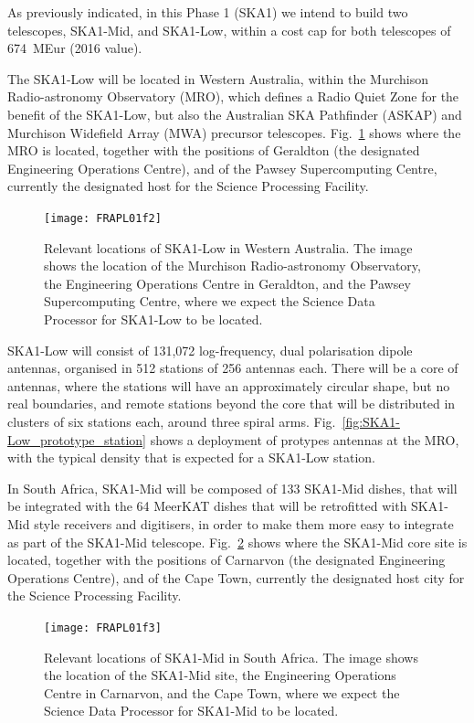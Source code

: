 \documentclass[a4paper,
               biblatex,       %
               keeplastbox,    %
               ]{jacow-2_1}    %
\begin{document}
As previously indicated, in this Phase 1 (SKA1) we intend to build two telescopes, SKA1-Mid, and SKA1-Low, within a cost cap for both telescopes of 674~MEur (2016 value).

The SKA1-Low will be located in Western Australia, within the Murchison Radio-astronomy Observatory (MRO), which defines a Radio Quiet Zone for the benefit of the SKA1-Low, but also the Australian SKA Pathfinder (ASKAP) and Murchison Widefield Array (MWA) precursor telescopes. Fig.~\ref{fig:SKA1-Low_locations} shows where the MRO is located, together with the positions of Geraldton (the designated Engineering Operations Centre), and of the Pawsey Supercomputing Centre, currently the designated host for the Science Processing Facility.

\begin{figure}[!tb]
  \centering
    \texttt{[image: FRAPL01f2]}
  \caption{Relevant locations of SKA1-Low in Western Australia. The image shows the location of the Murchison Radio-astronomy Observatory,  the Engineering Operations Centre in Geraldton, and the Pawsey Supercomputing Centre, where we expect the Science Data Processor for SKA1-Low to be located.}
  \label{fig:SKA1-Low_locations}
\end{figure}

SKA1-Low will consist of 131,072 log-frequency, dual polarisation dipole antennas, organised in 512 stations of 256 antennas each. There will be a core of antennas, where the stations will have an approximately circular shape, but no real boundaries, and remote stations beyond the core that will be distributed in clusters of six  stations each, around three spiral arms. Fig.~\ref{fig:SKA1-Low_prototype_station} shows a deployment of protypes antennas at the MRO, with the typical density that is expected for a SKA1-Low station.

In South Africa, SKA1-Mid will be composed of 133 SKA1-Mid dishes, that will be integrated with the 64 MeerKAT dishes that will be retrofitted with SKA1-Mid style receivers and digitisers, in order to make them more easy to integrate as part of the SKA1-Mid telescope.
Fig.~\ref{fig:SKA1-Mid_locations} shows where the SKA1-Mid core site is located, together with the positions of Carnarvon (the designated Engineering Operations Centre), and of the Cape Town, currently the designated host city for the Science Processing Facility.

\begin{figure}[!tb]
  \centering
    \texttt{[image: FRAPL01f3]}
  \caption{Relevant locations of SKA1-Mid in South Africa. The image shows the location of the SKA1-Mid site,  the Engineering Operations Centre in Carnarvon, and the Cape Town, where we expect the Science Data Processor for SKA1-Mid to be located.}
  \label{fig:SKA1-Mid_locations}
\end{figure}
\end{document}

